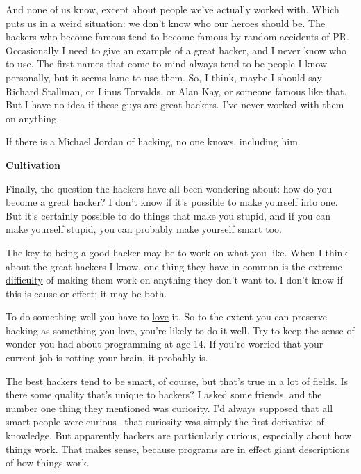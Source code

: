 And none of us know, except about people
                    we've actually worked with. Which puts us in a weird
                    situation: we don't know who our heroes should be. The
                    hackers who become famous tend to become famous by random
                    accidents of PR. Occasionally I need to give an example of a
                    great hacker, and I never know who to use. The first names
                    that come to mind always tend to be people I know
                    personally, but it seems lame to use them. So, I think,
                    maybe I should say Richard Stallman, or Linus Torvalds, or
                    Alan Kay, or someone famous like that. But I have no idea if
                    these guys are great hackers. I've never worked with them on
                    anything.

If there is a Michael Jordan of
                    hacking, no one knows, including him.

\textbf{Cultivation}

Finally, the question the hackers have all been
                    wondering about: how do you become a great hacker? I don't
                    know if it's possible to make yourself into one. But it's
                    certainly possible to do things that make you stupid, and if
                    you can make yourself stupid, you can probably make yourself
                    smart too.

The key to being a good hacker may be
                    to work on what you like. When I think about the great
                    hackers I know, one thing they have in common is the extreme
                    \href{http://www.paulgraham.com/procrastination.html}{difficulty} of making them
                    work on anything they don't want to. I don't know if this is
                    cause or effect; it may be both.

To do something
                    well you have to \href{http://www.paulgraham.com/love.html}{love} it. So to the
                    extent you can preserve hacking as something you love,
                    you're likely to do it well. Try to keep the sense of wonder
                    you had about programming at age 14. If you're worried that
                    your current job is rotting your brain, it probably is.

The
                    best hackers tend to be smart, of course, but that's true in
                    a lot of fields. Is there some quality that's unique to
                    hackers? I asked some friends, and the number one thing they
                    mentioned was curiosity. I'd always supposed that all smart
                    people were curious-- that curiosity was simply the first
                    derivative of knowledge. But apparently hackers are
                    particularly curious, especially about how things work. That
                    makes sense, because programs are in effect giant
                    descriptions of how things work.

